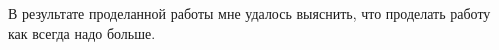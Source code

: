 \Conclusion %

В результате проделанной работы мне удалось выяснить, что проделать работу как всегда надо больше.

